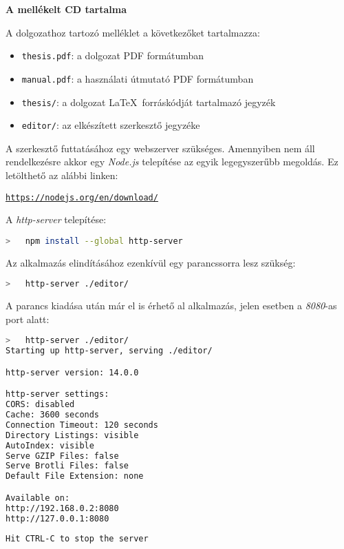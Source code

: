 \pagestyle{empty}

\noindent \textbf{\Large A mellékelt CD tartalma}

\vskip 1cm

\noindent A dolgozathoz tartozó melléklet a következőket tartalmazza:

\begin{itemize}
\item \texttt{thesis.pdf}: a dolgozat PDF formátumban
\item \texttt{manual.pdf}: a használati útmutató PDF formátumban
\item \texttt{thesis/}: a dolgozat \LaTeX\ forráskódját tartalmazó jegyzék
\item \texttt{editor/}: az elkészített szerkesztő jegyzéke
\end{itemize}

\vskip 0.5cm

\noindent
A szerkesztő futtatásához egy webszerver szükséges. Amennyiben nem áll rendelkezésre akkor egy \textit{Node.js} telepítése az egyik legegyszerűbb megoldás. Ez letölthető az alábbi linken:

\vskip 0.5cm
\noindent
\href{https://nodejs.org/en/download/}{\texttt{https://nodejs.org/en/download/}}

\vskip 0.5cm
\noindent
A \textit{http-server} telepítése:

\begin{lstlisting}[language=bash]
>   npm install --global http-server
\end{lstlisting}

\vskip 0.5cm

\noindent
Az alkalmazás elindításához ezenkívül egy parancssorra lesz szükség:

\begin{lstlisting}[language=bash]
>   http-server ./editor/
\end{lstlisting}

\vskip 0.5cm

\noindent
A parancs kiadása után már el is érhető al alkalmazás, jelen esetben a \textit{8080}-as port alatt:

\begin{lstlisting}[language=bash, alsoletter=0123456789, morekeywords={visible, none, disabled, seconds, 3600, 120, 8080}]
>   http-server ./editor/
Starting up http-server, serving ./editor/

http-server version: 14.0.0

http-server settings:
CORS: disabled
Cache: 3600 seconds
Connection Timeout: 120 seconds
Directory Listings: visible
AutoIndex: visible
Serve GZIP Files: false
Serve Brotli Files: false
Default File Extension: none

Available on:
http://192.168.0.2:8080
http://127.0.0.1:8080
	
Hit CTRL-C to stop the server
\end{lstlisting}
